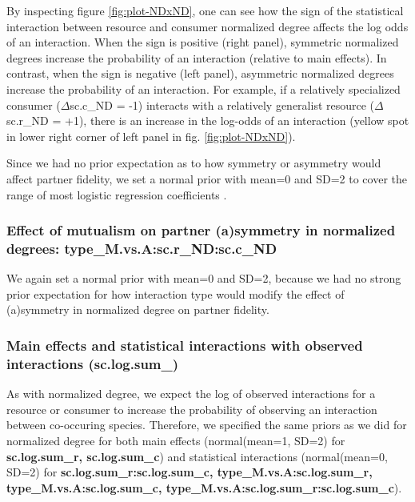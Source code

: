 \documentclass[11pt,]{article}
\begin{document}
By inspecting figure \ref{fig:plot-NDxND}, one can see how the sign of
the statistical interaction between resource and consumer normalized
degree affects the log odds of an interaction. When the sign is positive
(right panel), symmetric normalized degrees increase the probability of
an interaction (relative to main effects). In contrast, when the sign is
negative (left panel), asymmetric normalized degrees increase the
probability of an interaction. For example, if a relatively specialized
consumer (\(\Delta\)sc.c\_ND = -1) interacts with a relatively
generalist resource (\(\Delta\)sc.r\_ND = +1), there is an increase in
the log-odds of an interaction (yellow spot in lower right corner of
left panel in fig. \ref{fig:plot-NDxND}).

Since we had no prior expectation as to how symmetry or asymmetry would
affect partner fidelity, we set a normal prior with mean=0 and SD=2 to
cover the range of most logistic regression coefficients
\citep{Gelman2008}.

\subsubsection{\texorpdfstring{Effect of mutualism on partner
(a)symmetry in normalized degrees:
\textbf{type\_M.vs.A:sc.r\_ND:sc.c\_ND}}{Effect of mutualism on partner (a)symmetry in normalized degrees: type\_M.vs.A:sc.r\_ND:sc.c\_ND}}\label{effect-of-mutualism-on-partner-asymmetry-in-normalized-degrees-type_m.vs.asc.r_ndsc.c_nd}

We again set a normal prior with mean=0 and SD=2, because we had no
strong prior expectation for how interaction type would modify the
effect of (a)symmetry in normalized degree on partner fidelity.

\subsubsection{Main effects and statistical interactions with observed
interactions
(sc.log.sum\_)}\label{main-effects-and-statistical-interactions-with-observed-interactions-sc.log.sum_}

As with normalized degree, we expect the log of observed interactions
for a resource or consumer to increase the probability of observing an
interaction between co-occuring species. Therefore, we specified the
same priors as we did for normalized degree for both main effects
(normal(mean=1, SD=2) for \textbf{sc.log.sum\_r, sc.log.sum\_c}) and
statistical interactions (normal(mean=0, SD=2) for
\textbf{sc.log.sum\_r:sc.log.sum\_c, type\_M.vs.A:sc.log.sum\_r,
type\_M.vs.A:sc.log.sum\_c, type\_M.vs.A:sc.log.sum\_r:sc.log.sum\_c}).
\end{document}
